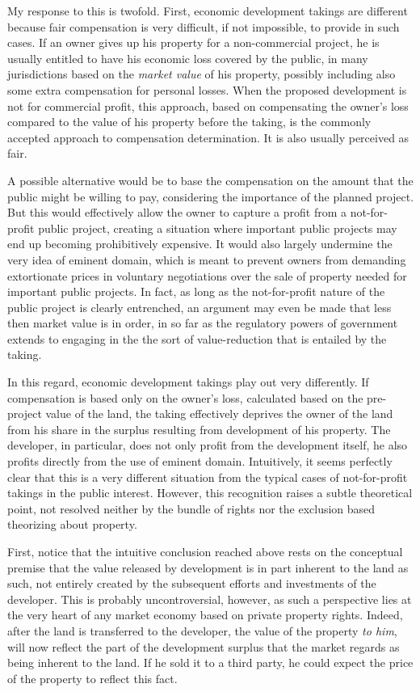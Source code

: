 My response to this is twofold. First, economic development takings are different because fair compensation is very difficult, if not impossible, to provide in such cases. If an owner gives up his property for a non-commercial project, he is usually entitled to have his economic loss covered by the public, in many jurisdictions based on the {\it market value} of his property, possibly including also some extra compensation for personal losses. When the proposed development is not for commercial profit, this approach, based on compensating the owner's loss compared to the value of his property before the taking, is the commonly accepted approach to compensation determination. It is also usually perceived as fair. 

A possible alternative would be to base the compensation on the amount that the public might be willing to pay, considering the importance of the planned project. But this would effectively allow the owner to capture a profit from a not-for-profit public project, creating a situation where important public projects may end up becoming prohibitively expensive. It would also largely undermine the very idea of eminent domain, which is meant to prevent owners from demanding extortionate prices in voluntary negotiations over the sale of property needed for important public projects. In fact, as long as the not-for-profit nature of the public project is clearly entrenched, an argument may even be made that less then market value is in order, in so far as the regulatory powers of government extends to engaging in the the sort of value-reduction that is entailed by the taking. 

In this regard, economic development takings play out very differently. If compensation is based only on the owner's loss, calculated based on the pre-project value of the land, the taking effectively deprives the owner of the land from his share in the surplus resulting from development of his property. The developer, in particular, does not only profit from the development itself, he also profits directly from the use of eminent domain. Intuitively, it seems perfectly clear that this is a very different situation from the typical cases of not-for-profit takings in the public interest. However, this recognition raises a subtle theoretical point, not resolved neither by the bundle of rights nor the exclusion based theorizing about property. 

First, notice that the intuitive conclusion reached above rests on the conceptual premise that the value released by development is in part inherent to the land as such, not entirely created by the subsequent efforts and investments of the developer. This is probably  uncontroversial, however, as such a perspective lies at the very heart of any market economy based on private property rights. Indeed, after the land is transferred to the developer, the value of the property {\it to him}, will now reflect the part of the development surplus that the market regards as being inherent to the land. If he sold it to a third party, he could expect the price of the property to reflect this fact.

